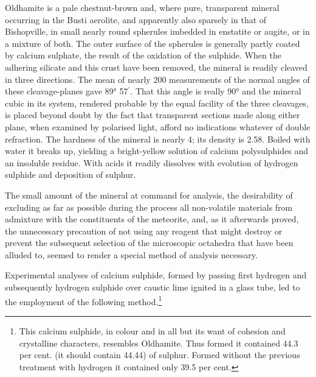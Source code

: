 \documentclass[a4paper, 12pt, oneside]{article}
\begin{document}
Oldhamite is a pale chestnut-brown and, where pure, transparent mineral occurring in the Busti aerolite, and apparently also sparsely in that of Bishopville, in small nearly round spherules imbedded in enstatite or augite, or in a mixture of both. The outer surface of the spherules is generally partly coated by calcium sulphate, the result of the oxidation of the sulphide. When the adhering silicate and this crust have been removed, the mineral is readily cleaved in three directions. The mean of nearly 200 measurements of the normal angles of these cleavage-planes gave 89° 57$^{\prime}$. That this angle is really 90° and the mineral cubic in its system, rendered probable by the equal facility of the three cleavages, is placed beyond doubt by the fact that transparent sections made along either plane, when examined by polarised light, afford no indications whatever of double refraction. The hardness of the mineral is nearly 4; its density is 2.58. Boiled with water it breaks up, yielding a bright-yellow solution of calcium polysulphides and an insoluble residue. With acids it readily dissolves with evolution of hydrogen sulphide and deposition of sulphur.

The small amount of the mineral at command for analysis, the desirability of excluding as far as possible during the process all non-volatile materials from admixture with the constituents of the meteorite, and, as it afterwards proved, the unnecessary precaution of not using any reagent that might destroy or prevent the subsequent selection of the microscopic octahedra that have been alluded to, seemed to render a special method of analysis necessary.

Experimental analyses of calcium sulphide, formed by passing first hydrogen and subsequently hydrogen sulphide over caustic lime ignited in a glass tube, led to the employment of the following method.\footnote{This calcium sulphide, in colour and in all but its want of cohesion and crystalline characters, resembles Oldhamite. Thus formed it contained 44.3 per cent. (it should contain 44.44) of sulphur. Formed without the previous treatment with hydrogen it contained only 39.5 per cent.}
\end{document}
